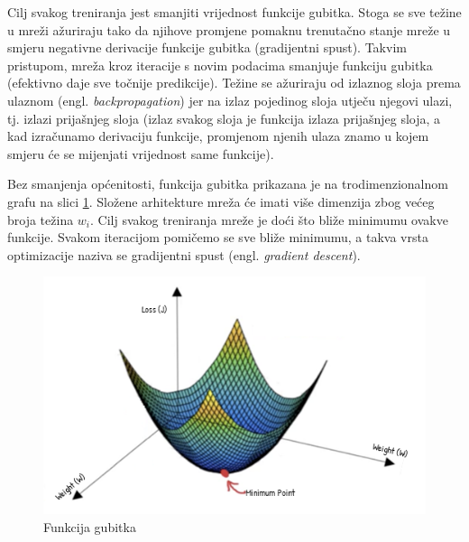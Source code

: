 

Cilj svakog treniranja jest smanjiti vrijednost funkcije gubitka. Stoga se sve težine u mreži
ažuriraju tako da njihove promjene pomaknu trenutačno stanje mreže u smjeru negativne derivacije
funkcije gubitka (gradijentni spust). Takvim pristupom, mreža kroz iteracije s novim podacima smanjuje funkciju gubitka
(efektivno daje sve točnije predikcije). Težine se ažuriraju od izlaznog sloja prema ulaznom 
(engl. \textit{backpropagation}) jer na izlaz pojedinog sloja utječu njegovi ulazi, tj. izlazi prijašnjeg
sloja (izlaz svakog sloja je funkcija izlaza prijašnjeg sloja, a kad izračunamo derivaciju
funkcije, promjenom njenih ulaza znamo u kojem smjeru će se mijenjati vrijednost same funkcije).



Bez smanjenja općenitosti, funkcija gubitka prikazana je na trodimenzionalnom grafu
na slici \ref{pic:descent}. Složene arhitekture mreža će imati više dimenzija zbog većeg broja
težina \( w_i \). Cilj svakog treniranja mreže je doći što bliže minimumu ovakve funkcije.
Svakom iteracijom pomičemo se sve bliže minimumu, a takva vrsta optimizacije naziva se
gradijentni spust (engl. \textit{gradient descent}).

\begin{figure}[htb]
  \centering
  \includegraphics[width=0.5\linewidth]{Chapters/neuronska_mreza/descent.png} 
  \caption{Funkcija gubitka \cite{desc}}
  \label{pic:descent}
\end{figure}






